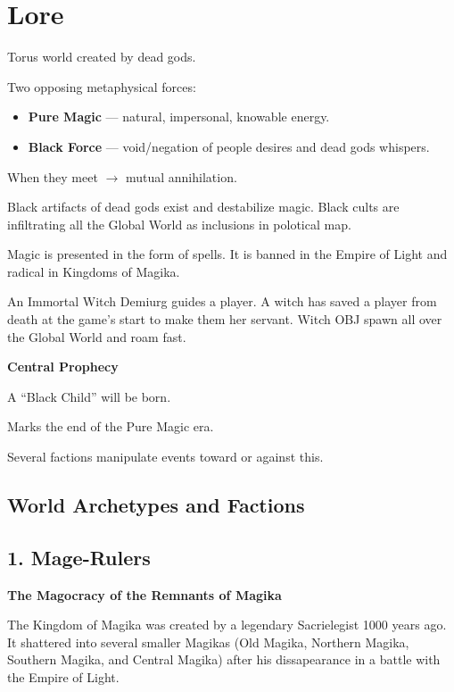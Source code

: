 \section{Lore}

Torus world created by dead gods.

Two opposing metaphysical forces:

\begin{itemize}
\item \textbf{Pure Magic} — natural, impersonal, knowable energy.
\item \textbf{Black Force} — void/negation of people desires and dead gods whispers.
\end{itemize}

When they meet $\rightarrow$ mutual annihilation.

Black artifacts of dead gods exist and destabilize magic. Black cults are infiltrating all the Global World as inclusions in polotical map. 

Magic is presented in the form of spells. It is banned in the Empire of Light and radical in Kingdoms of Magika.

An Immortal Witch Demiurg guides a player. A witch has saved a player from death at the game's start to make them her servant. Witch OBJ spawn all over the Global World and roam fast.

\textbf{Central Prophecy}

A ``Black Child'' will be born.

Marks the end of the Pure Magic era.

Several factions manipulate events toward or against this.



\subsection{World Archetypes and Factions}

\subsection{1. Mage-Rulers}

\textbf{The Magocracy of the Remnants of Magika}

The Kingdom of Magika was created by a legendary Sacrielegist 1000 years ago. It shattered into several smaller Magikas (Old Magika, Northern Magika, Southern Magika, and Central Magika) after his dissapearance in a battle with the Empire of Light.

